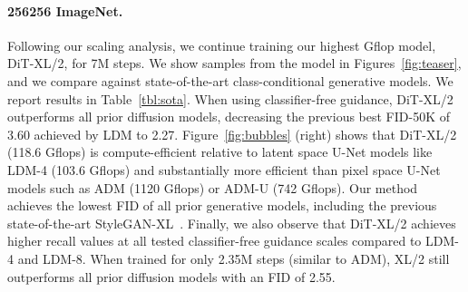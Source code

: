 \documentclass[10pt,twocolumn,letterpaper]{article}
\begin{document}
\paragraph{256256 ImageNet.} Following our scaling analysis, we continue training our highest Gflop model, DiT-XL/2, for 7M steps. We show samples from the model in Figures~\ref{fig:teaser}, and we compare against state-of-the-art class-conditional generative models. We report results in Table~\ref{tbl:sota}. When using classifier-free guidance, DiT-XL/2 outperforms all prior diffusion models, decreasing the previous best FID-50K of 3.60 achieved by LDM to 2.27. Figure~\ref{fig:bubbles} (right) shows that DiT-XL/2 (118.6 Gflops) is compute-efficient relative to latent space U-Net models like LDM-4 (103.6 Gflops) and substantially more efficient than pixel space U-Net models such as ADM (1120 Gflops) or ADM-U (742 Gflops). Our method achieves the lowest FID of all prior generative models, including the previous state-of-the-art StyleGAN-XL~\cite{Sauer2021ARXIV}. Finally, we also observe that DiT-XL/2 achieves higher recall values at all tested classifier-free guidance scales compared to LDM-4 and LDM-8. When trained for only 2.35M steps (similar to ADM), XL/2 still outperforms all prior diffusion models with an FID of 2.55. 
\end{document}
